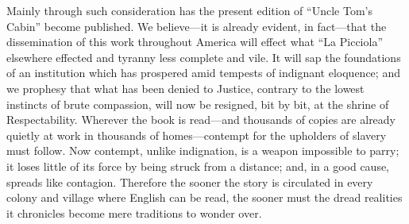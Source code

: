 Mainly through such consideration has the present edition of ``Uncle Tom's
Cabin'' become published. We believe---it is already evident, in fact---that the
dissemination of this work throughout America will effect what ``La Picciola''
elsewhere effected and tyranny less complete and vile. It will sap the
foundations of an institution which has prospered amid tempests of indignant
eloquence; and we prophesy that what has been denied to Justice, contrary to the
lowest instincts of brute compassion, will now be resigned, bit by bit, at the
shrine of Respectability. Wherever the book is read---and thousands of copies
are already quietly at work in thousands of homes---contempt for the upholders
of slavery must follow. Now contempt, unlike indignation, is a weapon impossible
to parry; it loses little of its force by being struck from a distance; and, in
a good cause, spreads like contagion. Therefore the sooner the story is
circulated in every colony and village where English can be read, the sooner
must the dread realities it chronicles become mere traditions to wonder over.

